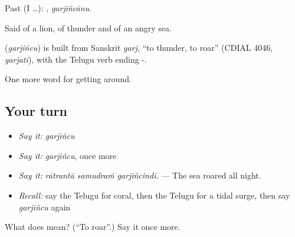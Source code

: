 Past (I …): , \emph{garjiñcānu}.

Said of a lion, of thunder and of an angry sea.

\begin{cousinweb}
\textbf{} (\emph{garjiñcu}) is built from Sanskrit \emph{garj}, \textquotedblleft{}to thunder, to roar\textquotedblright{} (CDIAL 4046, \emph{garjati}), with the Telugu verb ending -.
\end{cousinweb}

\begin{grammarlens}[title={What you've built}]
One more word for getting around.
\end{grammarlens}

\subsection*{Your turn}
\begin{itemize}
\raggedright
  \item \emph{Say it:} \emph{garjiñcu}
  \item \emph{Say it:} \emph{garjiñcu}, once more
  \item \emph{Say it:} \emph{rātrantā samudraṁ garjiñcindi.} — The sea roared all night.
  \item \emph{Recall:} say the Telugu for coral, then the Telugu for a tidal surge, then say \emph{garjiñcu} again
\end{itemize}

\begin{tcolorbox}[breakable,colback=teal!4,colframe=teal!35!black,title={Before you move on}]
What does  mean? (\textquotedblleft{}To roar\textquotedblright{}.) Say it once more.
\end{tcolorbox}
